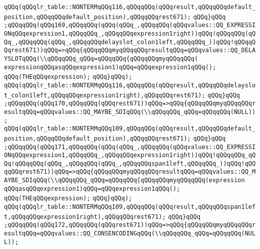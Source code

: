 \verb|qQQq(qQQqlr_table::NONTERMqQQq116,qQQqqQQq(qQQqresult,qQQqqQQqdefault_position,qQQqqQQqdefault_position),qQQqqQQqrest671);|\newline
\verb|qQQq}qQQq|\newline
\verb|;qQQqqQQq(qQQq169,qQQqqQQq(qQQq(qQQq_,qQQqqQQq(qQQqvalues::QQ_EXPRESSIONqQQqexpression1,qQQqqQQq_,qQQqqQQqexpression1right))qQQq!qQQqqQQq(qQQq_,qQQqqQQq(qQQq_,qQQqqQQqdelayslot_colon1left,qQQqqQQq_))qQQq!qQQqqQQqrest671))qQQq=>qQQq{qQQqqQQqmyqQQqqQQqresultqQQq=qQQqvalues::QQ_DELAYSLOTqQQq(\\qQQqqQQq_qQQq=qQQqqQQq{qQQqqQQqmyqQQqqQQq(|\newline
\verb|expressionqQQqasqQQqexpression1)qQQq=qQQqexpression1qQQq();|\newline
\verb|qQQq(THEqQQqexpression);|\newline
\verb|qQQq}qQQq);|\newline
\verb|qQQq(qQQqlr_table::NONTERMqQQq116,qQQqqQQq(qQQqresult,qQQqqQQqdelayslot_colon1left,qQQqqQQqexpression1right),qQQqqQQqrest671);|\newline
\verb|qQQq}qQQq|\newline
\verb|;qQQqqQQq(qQQq170,qQQqqQQq(qQQqrest671))qQQq=>qQQq{qQQqqQQqmyqQQqqQQqresultqQQq=qQQqvalues::QQ_MAYBE_SDIqQQq(\\qQQqqQQq_qQQq=qQQqqQQq(NULL));|\newline
\verb|qQQq(qQQqlr_table::NONTERMqQQq109,qQQqqQQq(qQQqresult,qQQqqQQqdefault_position,qQQqqQQqdefault_position),qQQqqQQqrest671);|\newline
\verb|qQQq}qQQq|\newline
\verb|;qQQqqQQq(qQQq171,qQQqqQQq(qQQq(qQQq_,qQQqqQQq(qQQqvalues::QQ_EXPRESSIONqQQqexpression1,qQQqqQQq_,qQQqqQQqexpression1right))qQQq!qQQqqQQq_qQQq!qQQqqQQq(qQQq_,qQQqqQQq(qQQq_,qQQqqQQqspan1left,qQQqqQQq_))qQQq!qQQqqQQqrest671))qQQq=>qQQq{qQQqqQQqmyqQQqqQQqresultqQQq=qQQqvalues::QQ_MAYBE_SDIqQQq(\\qQQqqQQq_qQQq=qQQqqQQq{qQQqqQQqmyqQQqqQQq(expression|\newline
\verb|qQQqasqQQqexpression1)qQQq=qQQqexpression1qQQq();|\newline
\verb|qQQq(THEqQQqexpression);|\newline
\verb|qQQq}qQQq);|\newline
\verb|qQQq(qQQqlr_table::NONTERMqQQq109,qQQqqQQq(qQQqresult,qQQqqQQqspan1left,qQQqqQQqexpression1right),qQQqqQQqrest671);|\newline
\verb|qQQq}qQQq|\newline
\verb|;qQQqqQQq(qQQq172,qQQqqQQq(qQQqrest671))qQQq=>qQQq{qQQqqQQqmyqQQqqQQqresultqQQq=qQQqvalues::QQ_CONSENCODINGqQQq(\\qQQqqQQq_qQQq=qQQqqQQq(NULL));|\newline
